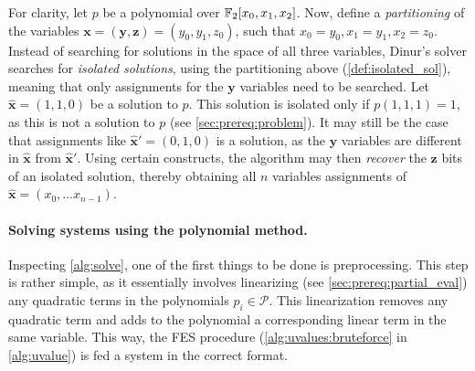 For clarity, let $p$ be a polynomial over $\mathbb{F}_2[x_0,x_1,x_2]$. Now, define a \textit{partitioning} of the variables $\mathbf{x} = (\mathbf{y}, \mathbf{z}) = (y_0, y_1, z_0)$, such that $x_0 = y_0, x_1 = y_1, x_2 = z_0$. Instead of searching for solutions in the space of all three variables, Dinur's solver searches for \textit{isolated solutions}, using the partitioning above (\cref{def:isolated_sol}), meaning that only assignments for the $\mathbf{y}$ variables need to be searched. Let $\hat{\mathbf{x}} = (1,1,0)$ be a solution to $p$. This solution is isolated only if $p(1,1,1) = 1$, as this is not a solution to $p$ (see \cref{sec:prereq:problem}). It may still be the case that assignments like $\hat{\mathbf{x}}' = (0,1,0)$ is a solution, as the $\mathbf{y}$ variables are different in $\hat{\mathbf{x}}$ from $\hat{\mathbf{x}}'$. Using certain constructs, the algorithm may then \textit{recover} the $\mathbf{z}$ bits of an isolated solution, thereby obtaining all $n$ variables assignments of $\hat{\mathbf{x}} = (x_0, \dots x_{n - 1})$. 

\paragraph{Solving systems using the polynomial method.} Inspecting \cref{alg:solve}, one of the first things to be done is preprocessing. This step is rather simple, as it essentially involves linearizing (see \cref{sec:prereq:partial_eval}) any quadratic terms in the polynomials $p_i \in \mathcal{P}$. This linearization removes any quadratic term and adds to the polynomial a corresponding linear term in the same variable. This way, the FES procedure (\cref{alg:uvalues:bruteforce} in \cref{alg:uvalue}) is fed a system in the correct format.

